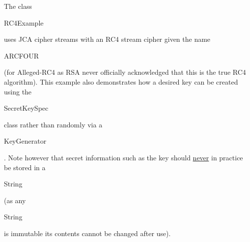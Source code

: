 The class \begin{code}RC4Example\end{code} uses JCA cipher streams
with an RC4 stream cipher given the name
\begin{code}ARCFOUR\end{code} (for Alleged-RC4 as RSA never officially
acknowledged that this is the true RC4 algorithm).
This example also demonstrates how a desired key can be created
using the \begin{code}SecretKeySpec\end{code} class rather than randomly
via a \begin{code}KeyGenerator\end{code}. Note however that
secret information such as the key should \underline{never} in practice
be stored in a \begin{code}String\end{code} (as any \begin{code}String\end{code}
is immutable its contents cannot be changed after use).
